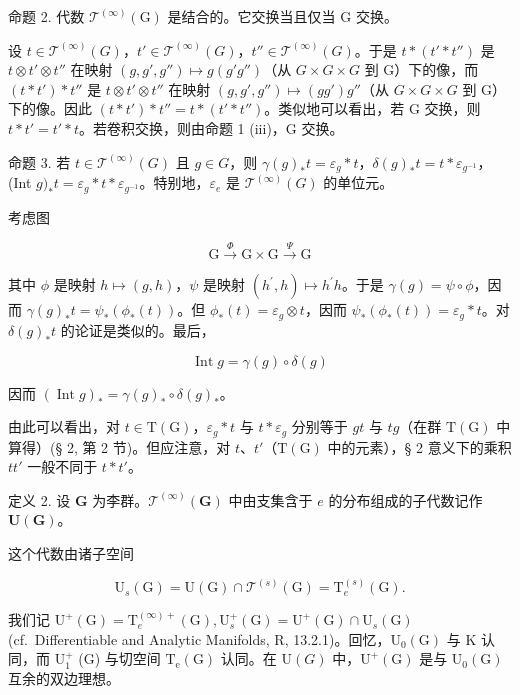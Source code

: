 命题 2. 代数 \(\mathcal{T}^{(\infty)}(\mathrm{G})\) 是结合的。它交换当且仅当 \(\mathrm{G}\) 交换。

设 \(t \in \mathcal{T}^{(\infty)}(G)\)，\(t' \in \mathcal{T}^{(\infty)}(G)\)，\(t'' \in \mathcal{T}^{(\infty)}(G)\)。于是 \(t * (t' * t'')\) 是 \(t \otimes t' \otimes t''\) 在映射 \((g, g', g'') \mapsto g(g'g'')\)（从 \(G \times G \times G\) 到 G）下的像，而 \((t * t') * t''\) 是 \(t \otimes t' \otimes t''\) 在映射 \((g, g', g'') \mapsto (gg')g''\)（从 \(G \times G \times G\) 到 G）下的像。因此 \((t * t') * t'' = t * (t' * t'')\)。类似地可以看出，若 G 交换，则 \(t * t' = t' * t\)。若卷积交换，则由命题 1 (iii)，G 交换。

命题 3. 若 \(t \in \mathcal{T}^{(\infty)}(G)\) 且 \(g \in G\)，则 \(\gamma(g)_*t = \varepsilon_g * t\)，\(\delta(g)_*t = t * \varepsilon_{g^{-1}}\)，(Int \(g)_*t = \varepsilon_g * t * \varepsilon_{g^{-1}}\)。特别地，\(\varepsilon_e\) 是 \(\mathcal{T}^{(\infty)}(G)\) 的单位元。

考虑图

\[
\mathrm{G} \xrightarrow {\Phi} \mathrm{G} \times \mathrm{G} \xrightarrow {\Psi} \mathrm{G}
\]

其中 \(\phi\) 是映射 \(h\mapsto (g,h)\)，\(\psi\) 是映射 \((h^{\prime},h)\mapsto h^{\prime}h\)。于是 \(\gamma (g) = \psi \circ \phi\)，因而 \(\gamma (g)_*t = \psi_*(\phi_*(t))\)。但 \(\phi_{*}(t) = \varepsilon_{g}\otimes t\)，因而 \(\psi_{*}(\phi_{*}(t)) = \varepsilon_{g}*t\)。对 \(\delta (g)_*t\) 的论证是类似的。最后，

\[
\operatorname{Int} g = \gamma (g) \circ \delta (g)
\]

因而 \((\operatorname{Int} g)_* = \gamma(g)_* \circ \delta(g)_*\)。

由此可以看出，对 \(t \in \mathrm{T}(\mathrm{G})\)，\(\varepsilon_g * t\) 与 \(t * \varepsilon_g\) 分别等于 \(gt\) 与 \(tg\)（在群 \(\mathrm{T}(\mathrm{G})\) 中算得）(§ 2, 第 2 节)。但应注意，对 \(t\)、\(t'\)（\(\mathrm{T}(\mathrm{G})\) 中的元素），§ 2 意义下的乘积 \(tt'\) 一般不同于 \(t * t'\)。

定义 2. 设 \(\mathbf{G}\) 为李群。\(\mathcal{T}^{(\infty)}(\mathbf{G})\) 中由支集含于 \(e\) 的分布组成的子代数记作 \(\mathbf{U}(\mathbf{G})\)。

这个代数由诸子空间

\[
\mathrm{U} _ {s} (\mathrm{G}) = \mathrm{U} (\mathrm{G}) \cap \mathcal {T} ^ {(s)} (\mathrm{G}) = \mathrm{T} _ {e} ^ {(s)} (\mathrm{G}).
\]

我们记 \(\mathrm{U}^{+}(\mathrm{G}) = \mathrm{T}_{e}^{(\infty)+}(\mathrm{G}),\mathrm{U}_{s}^{+}(\mathrm{G}) = \mathrm{U}^{+}(\mathrm{G})\cap \mathrm{U}_{s}(\mathrm{G})\) (cf.~Differentiable and Analytic Manifolds, R, 13.2.1)。回忆，\(\mathrm{U}_0(\mathrm{G})\) 与 K 认同，而 \(\mathrm{U}_1^+\) (G) 与切空间 \(\mathrm{T_e(G)}\) 认同。在 \(\mathrm{U}(G)\) 中，\(\mathrm{U}^{+}(\mathrm{G})\) 是与 \(\mathrm{U}_0(\mathrm{G})\) 互余的双边理想。

